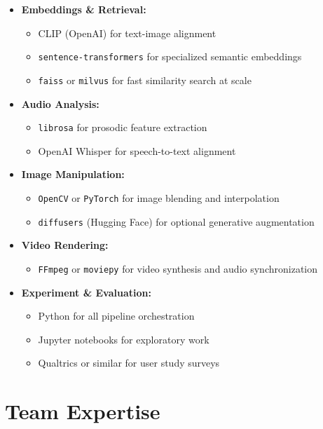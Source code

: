 \documentclass[11pt,a4paper]{article}
\begin{document}
\begin{itemize}
  \item \textbf{Embeddings \& Retrieval:}
  \begin{itemize}
    \item CLIP (OpenAI) for text-image alignment
    \item \texttt{sentence-transformers} for specialized semantic embeddings
    \item \texttt{faiss} or \texttt{milvus} for fast similarity search at scale
  \end{itemize}

  \item \textbf{Audio Analysis:}
  \begin{itemize}
    \item \texttt{librosa} for prosodic feature extraction
    \item OpenAI Whisper for speech-to-text alignment
  \end{itemize}

  \item \textbf{Image Manipulation:}
  \begin{itemize}
    \item \texttt{OpenCV} or \texttt{PyTorch} for image blending and interpolation
    \item \texttt{diffusers} (Hugging Face) for optional generative augmentation
  \end{itemize}

  \item \textbf{Video Rendering:}
  \begin{itemize}
    \item \texttt{FFmpeg} or \texttt{moviepy} for video synthesis and audio synchronization
  \end{itemize}

  \item \textbf{Experiment \& Evaluation:}
  \begin{itemize}
    \item Python for all pipeline orchestration
    \item Jupyter notebooks for exploratory work
    \item Qualtrics or similar for user study surveys
  \end{itemize}
\end{itemize}

\section*{Team Expertise}
\end{document}
